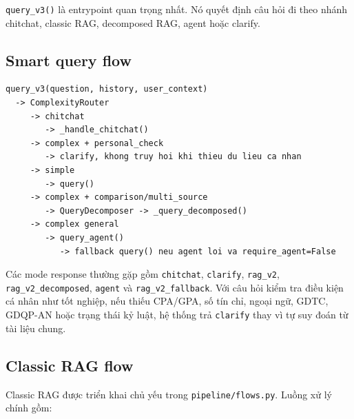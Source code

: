 \documentclass[../DoAn.tex]{subfiles}
\begin{document}
\texttt{query\_v3()} là entrypoint quan trọng nhất. Nó quyết định câu hỏi đi theo
nhánh chitchat, classic RAG, decomposed RAG, agent hoặc clarify.

\subsection{Smart query flow}

\begin{verbatim}
query_v3(question, history, user_context)
  -> ComplexityRouter
     -> chitchat
        -> _handle_chitchat()
     -> complex + personal_check
        -> clarify, khong truy hoi khi thieu du lieu ca nhan
     -> simple
        -> query()
     -> complex + comparison/multi_source
        -> QueryDecomposer -> _query_decomposed()
     -> complex general
        -> query_agent()
           -> fallback query() neu agent loi va require_agent=False
\end{verbatim}

Các mode response thường gặp gồm \texttt{chitchat}, \texttt{clarify},
\texttt{rag\_v2}, \texttt{rag\_v2\_decomposed}, \texttt{agent} và
\texttt{rag\_v2\_fallback}. Với câu hỏi kiểm tra điều kiện cá nhân như tốt
nghiệp, nếu thiếu CPA/GPA, số tín chỉ, ngoại ngữ, GDTC, GDQP-AN hoặc trạng thái
kỷ luật, hệ thống trả \texttt{clarify} thay vì tự suy đoán từ tài liệu chung.

\subsection{Classic RAG flow}

Classic RAG được triển khai chủ yếu trong \texttt{pipeline/flows.py}. Luồng xử lý
chính gồm:
\end{document}
